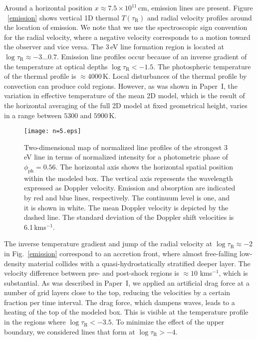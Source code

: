 \documentclass{aa}
\newcommand{\kmos}{kms$^{-1}$}
\begin{document}
Around a horizontal position  $x \approx 7.5\times 10^{11}$\,cm,  
emission lines are present.  Figure ~\ref{emission} 
shows vertical 1D thermal $T(\tau_\mathrm{R})$ and radial
velocity profiles around the location of emission.  We note that we use the
spectroscopic sign convention for the radial velocity, where a negative
velocity corresponds to a motion toward the observer and vice
versa.  The
 3\,eV line formation region is located at $\log \tau_\mathrm{R}
\approx -3 \ldots 0.7$.  Emission line profiles occur because of an inverse
gradient of the temperature at optical depths $\log\tau _\mathrm{R}
<-1.5$. The photospheric temperature of the thermal profile 
is $\approx 4000$\,K.  Local disturbances
of the thermal profile by convection can produce cold regions.  However, as
was shown in Paper~I, the variation in effective temperature of the mean 2D
model, which is the result of the horizontal averaging of the full 2D model at
fixed geometrical height, varies in a range between $5300$ and $5900$\,K.

\begin{figure}
\texttt{[image: n=5.eps]}

\caption{Two-dimensional map of 
normalized line profiles of the strongest  3 eV line in
  terms of normalized intensity for
  a photometric phase of $\phi_\mathrm{ph}=0.56$. The horizontal 
  axis shows the horizontal spatial position within the modeled box. 
  The vertical axis represents
  the wavelength expressed as Doppler velocity.  Emission and absorption are
  indicated by red and blue lines,  respectively.  The continuum level is one,
  and it is shown in white.  The mean Doppler velocity is depicted by the
  dashed line.  The standard deviation of the Doppler shift velocities is
  6.1\,\kmos.}
\label{n=5}
\end{figure} 
   
The inverse temperature gradient and jump of the radial velocity at $\log
\tau_\mathrm{R}\approx -2$ in Fig.~\ref{emission} correspond to an accretion
front, where almost free-falling low-density material collides with a quasi-hydrostatically stratified deeper layer. The velocity difference between pre-
and post-shock regions is $\approx10$ \kmos,  which is substantial.  As was
described in Paper~I, we applied an artificial drag force at a number of grid
layers close to the top, reducing the velocities by a certain fraction per
time interval.  The drag force, which dampens waves, leads to a heating of the
top of the modeled box. This is visible at the temperature profile in
the regions where $\log \tau_\mathrm{R} < - 3.5$.  To minimize the effect of
the upper boundary, we considered lines that form at $\log
\tau_\mathrm{R}>-4$.
\end{document}
